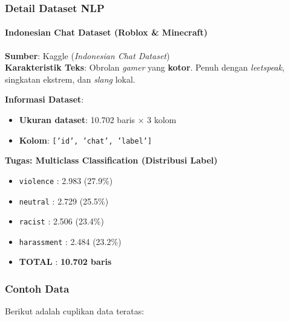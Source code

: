 \documentclass[t,aspectratio=169,xcolor=dvipsnames]{beamer}
\begin{document}
\begin{frame}
    \frametitle{Detail Dataset NLP}
    \framesubtitle{Indonesian Chat Dataset (Roblox \& Minecraft)}
    \small
    \textbf{Sumber}: Kaggle (\textit{Indonesian Chat Dataset})\\
    \textbf{Karakteristik Teks}: Obrolan \textit{gamer} yang \textbf{kotor}. Penuh dengan \textit{leetspeak}, singkatan ekstrem, dan \textit{slang} lokal.
    
    \vspace{0.2cm}
    \textbf{Informasi Dataset}:
    \begin{itemize}
        \item \textbf{Ukuran dataset}: 10.702 baris $\times$ 3 kolom
        \item \textbf{Kolom}: \texttt{['id', 'chat', 'label']}
    \end{itemize}
    
    \vspace{0.2cm}
    \textbf{Tugas: Multiclass Classification (Distribusi Label)}
    \begin{itemize}
        \item \texttt{violence} \hspace{0.4cm}: 2.983 (27.9\%)
        \item \texttt{neutral} \hspace{0.55cm}: 2.729 (25.5\%)
        \item \texttt{racist} \hspace{0.75cm}: 2.506 (23.4\%)
        \item \texttt{harassment} \hspace{0.1cm}: 2.484 (23.2\%)
        \item \textbf{TOTAL} \hspace{0.75cm}: \textbf{10.702 baris}
    \end{itemize}
\end{frame}

\begin{frame}
    \frametitle{Contoh Data}
    \small
    Berikut adalah cuplikan data teratas:
    \vspace{0.2cm}
    \begin{table}[]
    \end{table}
\end{frame}
\end{document}
